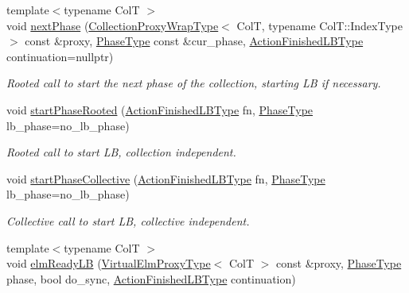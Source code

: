 \begin{DoxyCompactItemize}
{\footnotesize template$<$typename ColT $>$ }\\void \hyperlink{structvt_1_1vrt_1_1collection_1_1_collection_manager_aa9d5a1889d871bce9c49552847e50386}{next\+Phase} (\hyperlink{structvt_1_1vrt_1_1collection_1_1_collection_manager_a56458ed7f9bb22b631b9b3a745f42f94}{Collection\+Proxy\+Wrap\+Type}$<$ ColT, typename Col\+T\+::\+Index\+Type $>$ const \&proxy, \hyperlink{namespacevt_a46ce6733d5cdbd735d561b7b4029f6d7}{Phase\+Type} const \&cur\+\_\+phase, \hyperlink{structvt_1_1vrt_1_1collection_1_1_collection_manager_a2649daab7b437e1e2bdb5f2eefff29b6}{Action\+Finished\+L\+B\+Type} continuation=nullptr)
\begin{DoxyCompactList}\small\item\em Rooted call to start the next phase of the collection, starting LB if necessary. \end{DoxyCompactList}\item 
void \hyperlink{structvt_1_1vrt_1_1collection_1_1_collection_manager_aa3fe8c93775fd9c4878968112503a428}{start\+Phase\+Rooted} (\hyperlink{structvt_1_1vrt_1_1collection_1_1_collection_manager_a2649daab7b437e1e2bdb5f2eefff29b6}{Action\+Finished\+L\+B\+Type} fn, \hyperlink{namespacevt_a46ce6733d5cdbd735d561b7b4029f6d7}{Phase\+Type} lb\+\_\+phase=no\+\_\+lb\+\_\+phase)
\begin{DoxyCompactList}\small\item\em Rooted call to start LB, collection independent. \end{DoxyCompactList}\item 
void \hyperlink{structvt_1_1vrt_1_1collection_1_1_collection_manager_af7522c6048b723201d966094adfefa94}{start\+Phase\+Collective} (\hyperlink{structvt_1_1vrt_1_1collection_1_1_collection_manager_a2649daab7b437e1e2bdb5f2eefff29b6}{Action\+Finished\+L\+B\+Type} fn, \hyperlink{namespacevt_a46ce6733d5cdbd735d561b7b4029f6d7}{Phase\+Type} lb\+\_\+phase=no\+\_\+lb\+\_\+phase)
\begin{DoxyCompactList}\small\item\em Collective call to start LB, collective independent. \end{DoxyCompactList}\item 
{\footnotesize template$<$typename ColT $>$ }\\void \hyperlink{structvt_1_1vrt_1_1collection_1_1_collection_manager_a009a33f449e14d32d73aae33224298ef}{elm\+Ready\+LB} (\hyperlink{namespacevt_1_1vrt_a620a5c8c59d13e513f690c74b4af516f}{Virtual\+Elm\+Proxy\+Type}$<$ ColT $>$ const \&proxy, \hyperlink{namespacevt_a46ce6733d5cdbd735d561b7b4029f6d7}{Phase\+Type} phase, bool do\+\_\+sync, \hyperlink{structvt_1_1vrt_1_1collection_1_1_collection_manager_a2649daab7b437e1e2bdb5f2eefff29b6}{Action\+Finished\+L\+B\+Type} continuation)

\end{DoxyCompactItemize}
